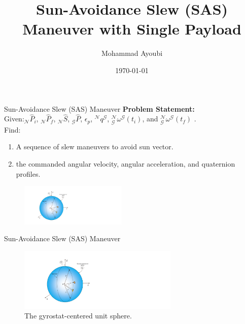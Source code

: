 \documentclass{beamer}
\title[Sun-Avoidance Slew (SAS) Maneuver ]{Sun-Avoidance Slew (SAS) Maneuver with Single Payload } %
\author{Mohammad Ayoubi} %
\date{\today} %
\begin{document}
\begin{frame}
  \titlepage
\end{frame}


\begin{frame}
\begin{block}{Sun-Avoidance Slew (SAS) Maneuver}
{\bf Problem Statement:}\\
Given:$_\mathcal{N}\hat{P}_i$, $_\mathcal{N}\hat{P}_f$, $_\mathcal{N}\hat{S}$, $_\mathcal{G}\hat{P}$, $\epsilon_p$, $^\mathcal{N}q^\mathcal{G}$, $^\mathcal{N}_\mathcal{G}\omega^\mathcal{G}(t_i)$, and $^\mathcal{N}_\mathcal{G}\omega^\mathcal{G}(t_f)$ .\\
Find: 
\begin{enumerate}
\item A sequence of slew maneuvers to avoid sun vector.
\item the commanded angular velocity, angular acceleration, and quaternion profiles.
\end{enumerate} 
\end{block}
\begin{figure}
\includegraphics[width=2in]{./Figures/SASSchematic1}
\end{figure}
\end{frame}
\begin{frame}
\begin{block}{Sun-Avoidance Slew (SAS) Maneuver}
\begin{figure}
\includegraphics[width=3in]{./Figures/SASSchematic1}
\caption{The gyrostat-centered unit sphere.}
\end{figure}
\end{block}
\end{frame}
\end{document}
